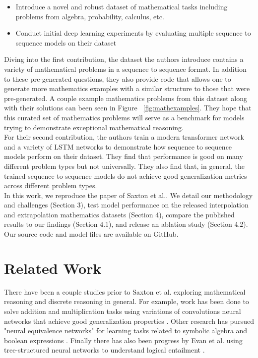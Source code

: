 \begin{itemize}
   \item Introduce a novel and robust dataset of mathematical tasks including problems from algebra, probability, calculus, etc.
   \item Conduct initial deep learning experiments by evaluating multiple sequence to sequence models on their dataset 
\end{itemize}

Diving into the first contribution, the dataset the authors introduce contains a variety of mathematical problems in a sequence to sequence format. In addition to these pre-generated questions, they also provide code that allows one to generate more mathematics examples with a similar structure to those that were pre-generated. A couple example mathematics problems from this dataset along with their solutions can been seen in Figure ~\ref{fig:mathexamples}. They hope that this curated set of mathematics problems will serve as a benchmark for models trying to demonstrate exceptional mathematical reasoning.  \\

For their second contribution, the authors train a modern transformer network \supercite{vaswani2017attention} and a variety of LSTM networks \supercite{hochreiter1997long} to demonstrate how sequence to sequence models perform on their dataset. They find that performance is good on many different problem types but not universally. They also find that, in general, the trained sequence to sequence models do not achieve good generalization metrics across different problem types.  \\ 


In this work, we reproduce the paper of Saxton et al.\supercite{DBLP:journals/corr/abs-1904-01557}. We detail our methodology and challenges (Section 3), test model performance on the released interpolation and extrapolation mathematics datasets (Section 4), compare the published results to our findings (Section 4.1),  and release an ablation study (Section 4.2).  Our source code and model files are available on GitHub\supercite{hs-math-nlp}.


\section{Related Work}

There have been a couple studies prior to Saxton et al. \supercite{DBLP:journals/corr/abs-1904-01557} exploring mathematical reasoning and discrete reasoning in general. For example, work has been done to solve addition and multiplication tasks using variations of convolutions neural networks that achieve good generalization properties \supercite{kaiser2015neural}. Other research has pursued "neural equivalence networks" for learning tasks related to symbolic algebra and boolean expressions \supercite{allamanis2017learning}. Finally there has also been progress by Evan et al. using tree-structured neural networks to understand logical entailment \supercite{evans2018neural}.   \\

